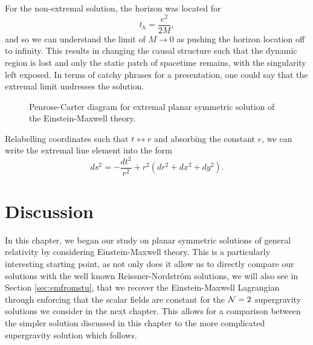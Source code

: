 For the non-extremal solution, the horizon was located for 
\begin{equation*}
	t_h = \frac{e^2}{2M},
\end{equation*}
and so we can understand the limit of $M \to 0$ as pushing the horizon location off to infinity. This results in changing the causal structure such that the dynamic region is lost and only the static patch of spacetime remains, with the singularity left exposed. In terms of catchy phrases for a presentation, one could say that the extremal limit undresses the solution.

\begin{figure}[h]
\centering
{}
\caption[Penrose-Carter diagram for extremal planar symmetric solution of the Einstein-Maxwell theory]{Penrose-Carter diagram for extremal planar symmetric solution of the Einstein-Maxwell theory.}
\label{fig:PCextremalplanarem}
\end{figure}

Relabelling coordinates such that $t \leftrightarrow r$ and absorbing the constant $e$, we can write the extremal line element into the form
\begin{equation*}
	ds^2 = - \frac{dt^2}{r^2} + r^2 \left(dr^2 + dx^2 + dy^2 \right).
\end{equation*}

\section{Discussion}

In this chapter, we began our study on planar symmetric solutions of general relativity by considering Einstein-Maxwell theory. This is a particularly interesting starting point, as not only does it allow us to directly compare our solutions with the well known Reissner-Nordstr\"om solutions, we will also see in Section \ref{sec:emfromstu}, that we recover the Einstein-Maxwell Lagrangian through enforcing that the scalar fields are constant for the ${\cal N} = 2$ supergravity solutions we consider in the next chapter. This allows for a comparison between the simpler solution discussed in this chapter to the more complicated supergravity solution which follows.

